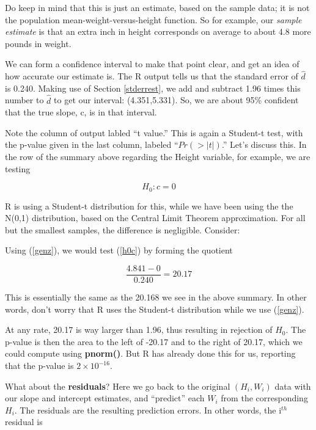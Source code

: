 Do keep in mind that this is just an estimate, based on the sample data;
it is not the population mean-weight-versus-height function.  So for
example, our {\it sample estimate} is that an extra inch in height
corresponds on average to about 4.8 more pounds in weight.  

We can form a confidence interval to make that point clear, and get an
idea of how accurate our estimate is.  The R output tells us that the
standard error of $\hat{d}$ is 0.240.  Making use of Section \ref{stderrest},
we add and subtract 1.96 times this number to $\hat{d}$ to get our interval:
(4.351,5.331).  So, we are about 95\% confident that the true slope, c,
is in that interval.

Note the column of output labled ``t value.''  This is again a Student-t
test, with the p-value given in the last column, labeled ``$Pr( >
|t|)$.''  Let's discuss this.  In the row of the summary above regarding
the Height variable, for example, we are testing

\begin{equation}
\label{h0c}
H_0:  c = 0
\end{equation}

R is using a Student-t distribution for this, while we have been using the
the N(0,1) distribution, based on the Central Limit Theorem
approximation.  For all but the smallest samples, the difference is
negligible.  Consider:

Using (\ref{genz}), we would test (\ref{h0c}) by forming the quotient

\begin{equation}
\frac{4.841 - 0}{0.240} = 20.17
\end{equation}

This is essentially the same as the 20.168 we see in the above summary.
In other words, don't worry that R uses the Student-t distribution while
we use (\ref{genz}).

At any rate, 20.17 is way larger than 1.96, thus resulting in rejection
of $H_0$.  The p-value is then the area to the left of -20.17 and to the
right of 20.17, which we could compute using {\bf pnorm()}.  But R has
already done this for us, reporting that the p-value is $2 \times
10^{-16}$.

What about the {\bf residuals}?  Here we go back to the original
$(H_i,W_i)$ data with our slope and intercept estimates, and ``predict''
each $W_i$ from the corresponding $H_i$.  The residuals are the
resulting prediction errors.  In other words, the i$^{th}$ residual is


